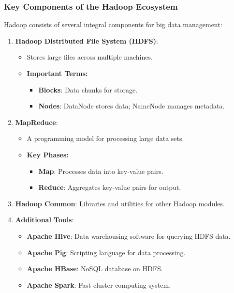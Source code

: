 \documentclass[aspectratio=169]{beamer}
\begin{document}
\begin{frame}[fragile]
    \frametitle{Key Components of the Hadoop Ecosystem}

    Hadoop consists of several integral components for big data management:
    
    \begin{enumerate}
        \item \textbf{Hadoop Distributed File System (HDFS)}:
        \begin{itemize}
            \item Stores large files across multiple machines.
            \item \textbf{Important Terms:}
            \begin{itemize}
                \item \textbf{Blocks}: Data chunks for storage.
                \item \textbf{Nodes}: DataNode stores data; NameNode manages metadata.
            \end{itemize}
        \end{itemize}

        \item \textbf{MapReduce}:
        \begin{itemize}
            \item A programming model for processing large data sets.
            \item \textbf{Key Phases:}
            \begin{itemize}
                \item \textbf{Map}: Processes data into key-value pairs.
                \item \textbf{Reduce}: Aggregates key-value pairs for output.
            \end{itemize}
        \end{itemize}

        \item \textbf{Hadoop Common}: Libraries and utilities for other Hadoop modules.
        
        \item \textbf{Additional Tools}:
        \begin{itemize}
            \item \textbf{Apache Hive}: Data warehousing software for querying HDFS data.
            \item \textbf{Apache Pig}: Scripting language for data processing.
            \item \textbf{Apache HBase}: NoSQL database on HDFS.
            \item \textbf{Apache Spark}: Fast cluster-computing system.
        \end{itemize}
    \end{enumerate}
\end{frame}
\end{document}
